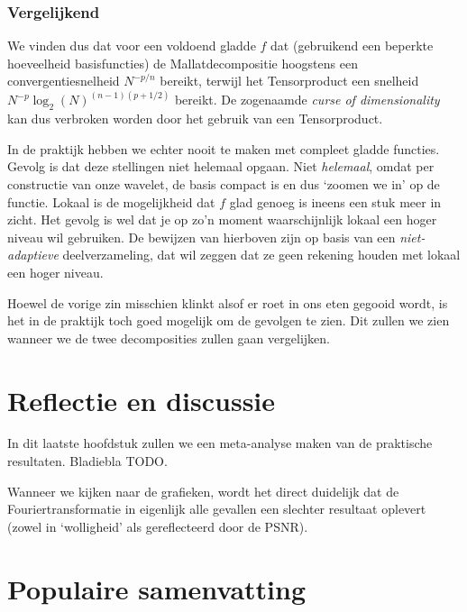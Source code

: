 \documentclass[11pt]{uvamath}
\theoremstyle{plain}
\theoremstyle{definition}
\theoremstyle{remark}
\begin{document}
\subsection{Vergelijkend}
We vinden dus dat voor een voldoend gladde $f$ dat (gebruikend een beperkte hoeveelheid basisfuncties) de Mallatdecompositie hoogstens een convergentiesnelheid $N^{-p/n}$ bereikt, terwijl het Tensorproduct een snelheid $N^{-p} \log_2(N)^{(n-1)(p+1/2)}$ bereikt. De zogenaamde \emph{curse of dimensionality} kan dus verbroken worden door het gebruik van een Tensorproduct.


In de praktijk hebben we echter nooit te maken met compleet gladde functies. Gevolg is dat deze stellingen niet helemaal opgaan. Niet \emph{helemaal}, omdat per constructie van onze wavelet, de basis compact is en dus `zoomen we in' op de functie. Lokaal is de mogelijkheid dat $f$ glad genoeg is ineens een stuk meer in zicht. Het gevolg is wel dat je op zo'n moment waarschijnlijk lokaal een hoger niveau wil gebruiken. De bewijzen van hierboven zijn op basis van een \emph{niet-adaptieve} deelverzameling, dat wil zeggen dat ze geen rekening houden met lokaal een hoger niveau.

Hoewel de vorige zin misschien klinkt alsof er roet in ons eten gegooid wordt, is het in de praktijk toch goed mogelijk om de gevolgen te zien. Dit zullen we zien wanneer we de twee decomposities zullen gaan vergelijken.



\chapter{Reflectie en discussie}
In dit laatste hoofdstuk zullen we een meta-analyse maken van de praktische resultaten. Bladiebla TODO.

Wanneer we kijken naar de grafieken, wordt het direct duidelijk dat de Fouriertransformatie in eigenlijk alle gevallen een slechter resultaat oplevert (zowel in `wolligheid' als gereflecteerd door de PSNR).
\chapter{Populaire samenvatting}
\end{document}
